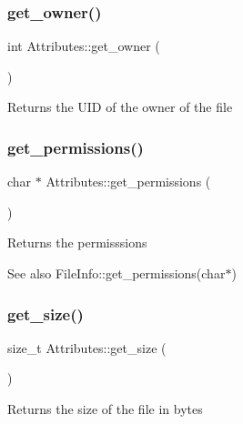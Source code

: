 \subsubsection{\texorpdfstring{get\+\_\+owner()}{get\_owner()}}
{\footnotesize\ttfamily int Attributes\+::get\+\_\+owner (\begin{DoxyParamCaption}{ }\end{DoxyParamCaption})}

\begin{DoxyReturn}{Returns}
the U\+ID of the owner of the file 
\end{DoxyReturn}
\mbox{\label{class_attributes_a52a8dc1b5d9c4c1eb19bcb336705cc42}} 
\subsubsection{\texorpdfstring{get\+\_\+permissions()}{get\_permissions()}}
{\footnotesize\ttfamily char $\ast$ Attributes\+::get\+\_\+permissions (\begin{DoxyParamCaption}{ }\end{DoxyParamCaption})}

\begin{DoxyReturn}{Returns}
the permisssions 
\end{DoxyReturn}
\begin{DoxySeeAlso}{See also}
File\+Info\+::get\+\_\+permissions(char$\ast$) 
\end{DoxySeeAlso}
\mbox{\label{class_attributes_a6e5df8252fc902c0fbe22058fe0b4fb1}} 
\subsubsection{\texorpdfstring{get\+\_\+size()}{get\_size()}}
{\footnotesize\ttfamily size\+\_\+t Attributes\+::get\+\_\+size (\begin{DoxyParamCaption}{ }\end{DoxyParamCaption})}

\begin{DoxyReturn}{Returns}
the size of the file in bytes 
\end{DoxyReturn}
\mbox{\label{class_attributes_ac33fbd6871ef707878690be92b9fc7ec}} 
